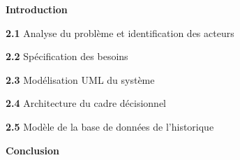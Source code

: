 \documentclass[12pt,a4paper]{report}
\begin{document}
	\vspace{0.8cm}
	
	
	\noindent
	\colorbox{bleuPrincipal}{%
		\parbox{\linewidth}{%
			\vspace{3pt}
			\hfill{\color{white}\bfseries }
			\vspace{3pt}
		}%
	}
	
	\vspace{3pt}
	\begin{list}{}{%
			\setlength{\leftmargin}{0pt}
			\setlength{\itemsep}{2pt}
		}
		\item \textbf{Introduction} \dotfill
		
		\vspace{4pt}
		\item \textbf{2.1} \quad Analyse du probl\`eme et identification des acteurs \dotfill
		
		\vspace{4pt}
		\item \textbf{2.2} \quad Sp\'ecification des besoins \dotfill
		
		\vspace{4pt}
		\item \textbf{2.3} \quad Mod\'elisation UML du syst\`eme \dotfill
		
		\vspace{4pt}
		\item \textbf{2.4} \quad Architecture du cadre d\'ecisionnel \dotfill
		
		\vspace{4pt}
		\item \textbf{2.5} \quad Mod\`ele de la base de donn\'ees de l'historique \dotfill
		
		\vspace{4pt}
		\item \textbf{Conclusion} \dotfill
	\end{list}
	
	\vspace{0.8cm}
	
	
	\noindent
	\colorbox{bleuPrincipal}{%
		\parbox{\linewidth}{%
			\vspace{3pt}
			\hfill{\color{white}\bfseries }
			\vspace{3pt}
		}%
	}
	
\end{document}
